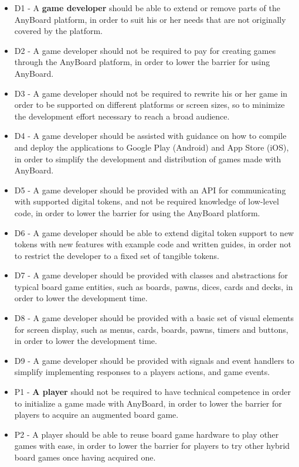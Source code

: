 \begin{itemize}
\item D1 - A \textbf{game developer} should be able to extend or remove parts of the AnyBoard platform, in order to suit his or her needs that are not originally covered by the platform.
\item D2 - A game developer should not be required to pay for creating games through the AnyBoard platform, in order to lower the barrier for using AnyBoard.
\item D3 - A game developer should not be required to rewrite his or her game in order to be supported on different platforms or screen sizes, so to minimize the development effort necessary to reach a broad audience.
\item D4 - A game developer should be assisted with guidance on how to compile and deploy the applications to Google Play (Android) and App Store (iOS), in order to simplify the development and distribution of games made with AnyBoard.
\item D5 - A game developer should be provided with an API for communicating with supported digital tokens, and not be required knowledge of low-level code, in order to lower the barrier for using the AnyBoard platform.
\item D6 - A game developer should be able to extend digital token support to new tokens with new features with example code and written guides, in order not to restrict the developer to a fixed set of tangible tokens.
\item D7 - A game developer should be provided with classes and abstractions for typical board game entities, such as boards, pawns, dices, cards and decks, in order to lower the development time.
\item D8 - A game developer should be provided with a basic set of visual elements for screen display, such as menus, cards, boards, pawns, timers and buttons, in order to lower the development time.
\item D9 - A game developer should be provided with signals and event handlers to simplify implementing responses to a players actions, and game events.
\end{itemize}
\begin{itemize}
\item P1 - \textbf{A player} should not be required to have technical competence in order to initialize a game made with AnyBoard, in order to lower the barrier for players to acquire an augmented board game.
\item P2 - A player should be able to reuse board game hardware to play other games with ease, in order to lower the barrier for players to try other hybrid board games once having acquired one.
\end{itemize}

